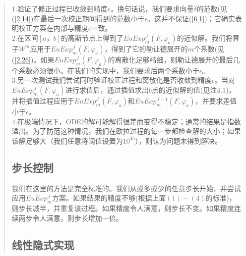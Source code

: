 \documentclass{article}
\begin{document}
\begin{CJK}{UTF8}{gkai}
\begin{quotation}
$1$.验证了修正过程已收敛到精度$\epsilon$。换句话说，我们要求向量$\delta$的范数(见(\ref{2.14})在最后一次校正期间得到的范数小于$\epsilon$。这并不保证(\ref{6.1})；它确实表明校正方案在内部与精度$\epsilon$一致。\\

$2$.在区间$[a，b]$的高斯节点上得到了$EuExp^J_m(F,\varphi_a)$的近似解。我们将算子$W^m$应用于$EuExp^J_m(F,\varphi_a)$，得到了它的勒让德展开的$m$个系数(见(\ref{2.26})。如果$EuExp^J_m(F,\varphi_a)$的离散化足够精细，则勒让德展开的最后几个系数必须很小。在我们的实现中，我们要求后两个系数小于$\epsilon$。\\

$3$.另一次测试我们尝试同时验证校正过程和离散化是否收敛到精度$\epsilon$。当对$EuExp^J_m(F,\varphi_a)$进行求值后，通过插值求出$b$点的近似解的值(见$注4.1$)，并将插值过程应用于$EuExp^J_m(F,\varphi_a)$和$EuExp^{J-1}_m(F,\varphi_a)$，并要求差值小于$\epsilon$。\\

$4$.在极端情况下，ODE的解可能解得很差而变得不稳定；通常的结果是指数溢出。为了防范这种情况，我们在欧拉过程的每一步都检查解的大小；如果该解足够大（我们任意将阈值设置为$10^{35}$），则认为问题未得到解决。\\
\subsection{步长控制}

我们在这里的方法是完全标准的。我们从或多或少的任意步长开始，并尝试应用$EuExp^J_m$方案。如果结果的精度不够(根据上面$(1)-(4)$的标准)，则步长减半，并重复该过程。如果精度令人满意，则步长不变。如果精度连续两步令人满意，则步长增加一倍。\\
\subsection{线性隐式实现}


\end{quotation}
\end{CJK}
\end{document}
